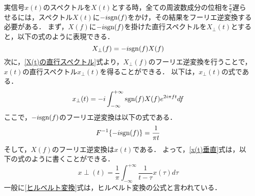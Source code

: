 実信号$x(t)$のスペクトルを$X(t)$とする時，全ての周波数成分の位相を$\frac{\pi}{2}$遅らせるには，スペクトル$X(t)$に$-i {\rm{sgn}} (f)$をかけ，その結果をフーリエ逆変換する必要がある．
まず，$X(f)$に$-i{\rm{sgn}}(f)$を掛けた直行スペクトルを$X_{\perp}(t)$とすると，以下の式のように表現できる．
\begin{equation}
    \label{X(t)の直行スペクトル}
    X_{\perp}(f) = -i {\rm{sgn}} (f) X (f)
\end{equation}
%
次に，\ref{X(t)の直行スペクトル}式より，$X_{\perp} (f)$のフーリエ逆変換を行うことで，$x(t)$の直行スペクトル$x_{\perp}(t)$を得ることができる．
以下は，$x_{\perp}(t)$の式である．
\begin{equation}
    \label{x(t)垂直}
    x_{\perp} (t) = -i \int^{+\infty}_{-\infty} {\rm{sgn}} (f) X(f) e^{2 i \pi f t} df
\end{equation}
%
ここで，$-i {\rm{sgn}} (f)$のフーリエ逆変換は以下の式である．
\begin{equation}
    \label{シグナル関数のフーリエ変換}
    F^{-1} \lbrace -i {\rm{sgn}} (f) \rbrace = \frac{1}{\pi t}
\end{equation}
%
そして，$X(f)$のフーリエ逆変換は$x(t)$である．
よって，\ref{x(t)垂直}式は，以下の式のように書くことができる．
\begin{equation}
    \label{ヒルベルト変換}
    x {\perp} (t) = \frac{1}{\pi} \int^{+\infty}_{-\infty} \frac{1}{t - \tau} x(\tau) d\tau
\end{equation}
%
一般に\ref{ヒルベルト変換}式は，ヒルベルト変換の公式と言われている．

%